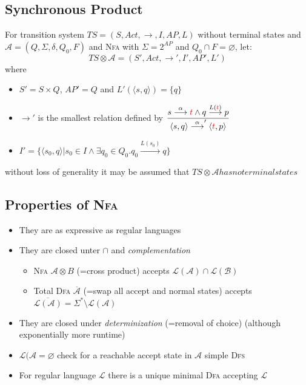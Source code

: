 \documentclass[a4paper, 10pt]{article}
\begin{document}
\subsection*{Synchronous Product}
\begin{shaded}
\begin{multicols}{2}
For transition system $TS=(S,Act,\to,I,AP,L)$ without terminal states and $\mathcal{A}=(Q,\Sigma,\delta,Q_0,F)$ and \textsc{Nfa} with $\Sigma=2^{AP}$ and $Q_0\cap F=\varnothing$, let:
    \[ TS \otimes\mathcal{A}=(S',Act,\to',I',AP',L') \]
    where
    \begin{itemize}
        \item $S'=S\times Q$, $AP'=Q$ and $L'(\langle s,q \rangle) = \{ q \}$
        \item $\to'$ is the smallest relation defined by
        $\displaystyle \frac{
            s\overset{\alpha}{\longrightarrow}\textcolor{red}{t} \wedge q \overset{L(\textcolor{red}{t})}{\longrightarrow} p
        }{
        \langle s,q \rangle \overset{\alpha}{\longrightarrow}' \langle \textcolor{red}{t},p \rangle
        }$
        \item $I'=\{ \langle s_0,q \rangle | s_0\in I\wedge \exists q_0\in Q_0. q_0 \overset{L(s_0)}{\longrightarrow} q\}$
    \end{itemize}
    without loss of generality it may be assumed that $TS\otimes\mathcal{A} has no terminal states$
\columnbreak
\begin{center}
\scalebox{0.5}{}
\end{center}
\end{multicols}
\end{shaded}

\subsection*{Properties of \textsc{Nfa}}
\begin{itemize}
    \item They are as expressive as regular languages
    \item They are closed unter $\cap$ and \emph{complementation}
    \begin{itemize}
        \item \textsc{Nfa} $\mathcal{A}\otimes B$ (=cross product) accepts $\mathcal{L}(\mathcal{A})\cap\mathcal{L}(\mathcal{B})$
        \item Total \textsc{Dfa} $\overline{\mathcal{A}}$ (=swap all accept and normal states) accepts $\overline{\mathcal{L}(\mathcal{A})}=\Sigma^*\setminus\mathcal{L}(\mathcal{A})$
    \end{itemize}
    \item They are closed under \emph{determinization} (=removal of choice) {\tiny (although exponentially more runtime)}
    \item $\mathcal{L}(\mathcal{A}=\varnothing$ \follows check for a reachable accept state in $\mathcal{A}$ \follows simple \textsc{Dfs}
    \item For regular language $\mathcal{L}$ there is a unique minimal \textsc{Dfa} accepting $\mathcal{L}$
\end{itemize}
\end{document}
